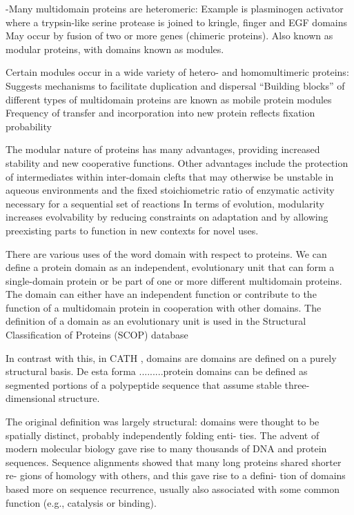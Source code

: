 -Many multidomain proteins are heteromeric: Example is plasminogen activator where a trypsin-like serine protease is joined to kringle, finger and EGF domains
May occur by fusion of two or more genes (chimeric proteins). Also known as modular proteins, with domains known as modules. 

Certain modules occur in a wide variety of hetero- and homomultimeric proteins:
Suggests mechanisms to facilitate duplication and dispersal
“Building blocks” of different types of multidomain proteins are known as mobile protein modules
Frequency of transfer and incorporation into new protein reflects fixation probability


The modular nature of proteins has many advantages, providing increased stability and new cooperative functions.
Other advantages include the protection of intermediates within inter-domain clefts that may otherwise be unstable in aqueous environments and the fixed stoichiometric ratio of enzymatic activity necessary for a sequential set of reactions
In terms of evolution, modularity increases evolvability by reducing constraints on adaptation and by allowing preexisting parts to function in new contexts for novel uses.

There are various uses of the word domain with respect to proteins. 
We can define a protein domain as an independent, evolutionary unit that can form a single-domain protein or be part of one or more different multidomain proteins. The domain can either have an independent
function or contribute to the function of a multidomain protein in cooperation with other domains. 
The definition of a domain as an evolutionary unit is used in the Structural Classification of Proteins (SCOP) database \cite{murzin1995scop}

In contrast with this, in CATH \cite{orengo1997cath}, domains are domains are defined on a purely structural basis.
De esta forma .........protein domains can be defined as segmented portions of a polypeptide sequence that assume stable three-dimensional structure.

The original definition was largely structural: domains were thought
to be spatially distinct, probably independently folding enti-
ties. The advent of modern molecular biology gave rise to
many thousands of DNA and protein sequences. Sequence
alignments showed that many long proteins shared shorter re-
gions of homology with others, and this gave rise to a defini-
tion of domains based more on sequence recurrence, usually
also associated with some common function (e.g., catalysis
or binding). 

